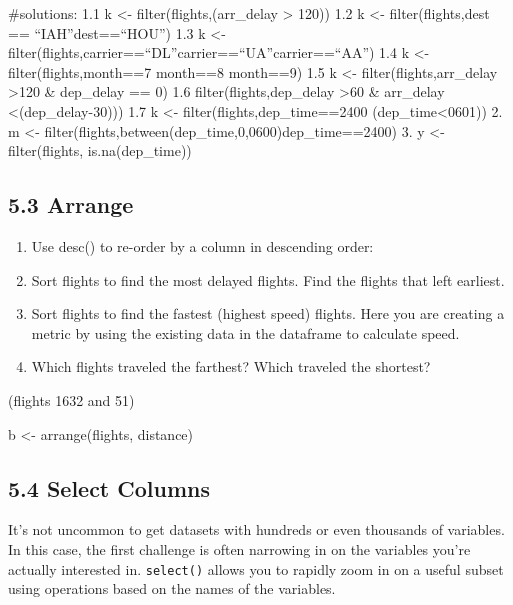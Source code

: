 \documentclass[
]{article}
\newenvironment{Shaded}{\begin{snugshade}}{\end{snugshade}}
\newcommand{\FunctionTok}[1]{\textcolor[rgb]{0.00,0.00,0.00}{#1}}
\newcommand{\NormalTok}[1]{#1}
\newcommand{\OtherTok}[1]{\textcolor[rgb]{0.56,0.35,0.01}{#1}}
\begin{document}
\#solutions: 1.1 k \textless- filter(flights,(arr\_delay \textgreater{}
120)) 1.2 k \textless- filter(flights,dest ==
``IAH''\textbar dest==``HOU'') 1.3 k \textless-
filter(flights,carrier==``DL''\textbar carrier==``UA''\textbar carrier==``AA'')
1.4 k \textless- filter(flights,month==7 \textbar{} month==8 \textbar{}
month==9) 1.5 k \textless- filter(flights,arr\_delay \textgreater120 \&
dep\_delay == 0) 1.6 filter(flights,dep\_delay \textgreater60 \&
arr\_delay \textless(dep\_delay-30))) 1.7 k \textless-
filter(flights,dep\_time==2400 \textbar{} (dep\_time\textless0601)) 2. m
\textless-
filter(flights,between(dep\_time,0,0600)\textbar dep\_time==2400) 3. y
\textless- filter(flights, is.na(dep\_time))

\hypertarget{arrange}{%
\subsection{5.3 Arrange}\label{arrange}}

\begin{enumerate}
\def\labelenumi{\arabic{enumi}.}
\item
  Use desc() to re-order by a column in descending order:
\item
  Sort flights to find the most delayed flights. Find the flights that
  left earliest.
\item
  Sort flights to find the fastest (highest speed) flights. Here you are
  creating a metric by using the existing data in the dataframe to
  calculate speed.
\item
  Which flights traveled the farthest? Which traveled the shortest?
\end{enumerate}

(flights 1632 and 51)

\begin{Shaded}
\begin{Highlighting}[]
\NormalTok{b }\OtherTok{\textless{}{-}} \FunctionTok{arrange}\NormalTok{(flights, distance)}
\end{Highlighting}
\end{Shaded}

\hypertarget{select-columns}{%
\subsection{5.4 Select Columns}\label{select-columns}}

It's not uncommon to get datasets with hundreds or even thousands of
variables. In this case, the first challenge is often narrowing in on
the variables you're actually interested in. \texttt{select()} allows
you to rapidly zoom in on a useful subset using operations based on the
names of the variables.
\end{document}
